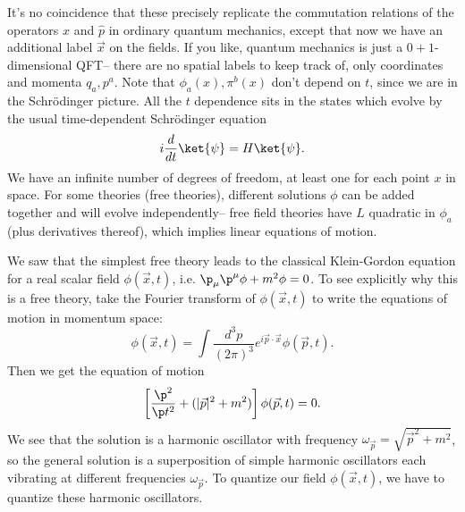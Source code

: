 It's no coincidence that these precisely replicate the commutation relations of the operators $\hat x$ and $\hat p$ in ordinary quantum mechanics, except that now we have an additional label $\vec x$ on the fields. If you like, quantum mechanics is just a $0+1$-dimensional QFT-- there are no spatial labels to keep track of, only coordinates and momenta $q_a,p^a$. Note that $\phi_a(x), \pi^b(x)$ don't depend on $t$, since we are in the Schr\"odinger picture. All the $t$ dependence sits in the states which evolve by the usual time-dependent Schr\"odinger equation
$$i\frac{d}{dt} \ket{\psi}=H\ket{\psi}.$$
We have an infinite number of degrees of freedom, at least one for each point $x$ in space. For some theories (free theories), different solutions $\phi$ can be added together and will evolve independently-- free field theories have $L$ quadratic in $\phi_a$ (plus derivatives thereof), which implies linear equations of motion.

We saw that the simplest free theory leads to the classical Klein-Gordon equation for a real scalar field $\phi(\vec{x},t)$, i.e. $\p_\mu \p^\mu \phi+m^2\phi=0$. To see explicitly why this is a free theory, take the Fourier transform of $\phi(\vec x,t)$ to write the equations of motion in momentum space:
$$\phi(\vec{x},t)=\int \frac{d^3 p}{(2\pi)^3} e^{i \vec{p}\cdot \vec{x}}\phi (\vec{p},t).$$
Then we get the equation of motion
$$\left[\frac{\p^2}{\p t^2}+(|\vec{p}|^2+m^2)\right] \phi(\vec{p},t)=0.$$
We see that the solution is a harmonic oscillator with frequency $\omega_{\vec p} = \sqrt{\vec{p}^2 +m^2}$, so the general solution is a superposition of simple harmonic oscillators each vibrating at different frequencies $\omega_{\vec{p}}$. To quantize our field $\phi(\vec{x},t)$, we have to quantize these harmonic oscillators.

